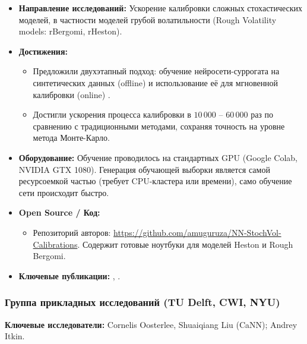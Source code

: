 \documentclass[12pt, a4paper]{article}
\begin{document}
\begin{itemize}
    \item \textbf{Направление исследований:} Ускорение калибровки сложных стохастических моделей, в частности моделей грубой волатильности (Rough Volatility models: rBergomi, rHeston).
    \item \textbf{Достижения:}
    \begin{itemize}
        \item Предложили двухэтапный подход: обучение нейросети-суррогата на синтетических данных (offline) и использование её для мгновенной калибровки (online) \cite{Horvath2019, Bayer2019}.
        \item Достигли ускорения процесса калибровки в $10\,000$ -- $60\,000$ раз по сравнению с традиционными методами, сохраняя точность на уровне метода Монте-Карло.
    \end{itemize}
    \item \textbf{Оборудование:} Обучение проводилось на стандартных GPU (Google Colab, NVIDIA GTX 1080). Генерация обучающей выборки является самой ресурсоемкой частью (требует CPU-кластера или времени), само обучение сети происходит быстро.
    \item \textbf{Open Source / Код:}
    \begin{itemize}
        \item Репозиторий авторов: \url{https://github.com/amuguruza/NN-StochVol-Calibrations}. Содержит готовые ноутбуки для моделей Heston и Rough Bergomi.
    \end{itemize}
    \item \textbf{Ключевые публикации:} \cite{Horvath2019}, \cite{Bayer2019}.
\end{itemize}

\subsubsection{Группа прикладных исследований (TU Delft, CWI, NYU)}
\textbf{Ключевые исследователи:} Cornelis Oosterlee, Shuaiqiang Liu (CaNN); Andrey Itkin.
\end{document}
